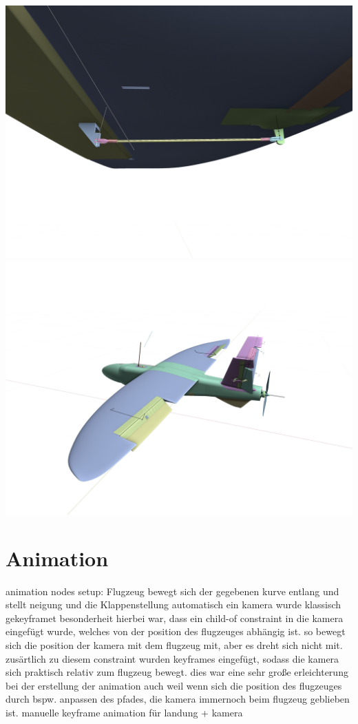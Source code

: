 \includegraphics[width=\textwidth]{gfx/prod/plane/plane7.jpg}
\includegraphics[width=\textwidth]{gfx/prod/plane/plane8.jpg}

\section{Animation}

animation nodes setup: Flugzeug bewegt sich der gegebenen kurve entlang und stellt neigung und die Klappenstellung automatisch ein
kamera wurde klassisch gekeyframet
besonderheit hierbei war, dass ein child-of constraint in die kamera eingefügt wurde, welches von der position des flugzeuges abhängig ist.
so bewegt sich die position der kamera mit dem flugzeug mit, aber es dreht sich nicht mit. zusärtlich zu diesem constraint wurden keyframes eingefügt, sodass die kamera sich praktisch relativ zum flugzeug bewegt.
dies war eine sehr große erleichterung bei der erstellung der animation
auch weil wenn sich die position des flugzeuges durch bspw. anpassen des pfades, die kamera immernoch beim flugzeug geblieben ist.
manuelle keyframe animation für landung + kamera

